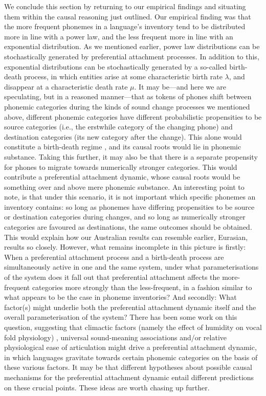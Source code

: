 We conclude this section by returning to our empirical findings and situating them within the causal reasoning just outlined. Our empirical finding was that the more frequent phonemes in a language's inventory tend to be distributed more in line with a power law, and the less frequent more in line with an exponential distribution. As we mentioned earlier, power law distributions can be stochastically generated by preferential attachment processes. In addition to this, exponential distributions can be stochastically generated by a so-called birth-death process, in which entities arise at some characteristic birth rate \(\lambda\), and disappear at a characteristic death rate \(\mu\). It may be---and here we are speculating, but in a reasoned manner---that as tokens of phones shift between phonemic categories during the kinds of sound change processes we mentioned above, different phonemic categories have different probabilistic propensities to be source categories (i.e., the erstwhile category of the changing phone) and destination categories (its new category after the change). This alone would constitute a birth-death regime \autocite{cysouw_probability_2009}, and its causal roots would lie in phonemic substance. Taking this further, it may also be that there is a separate propensity for phones to migrate towards numerically stronger categories. This would contribute a preferential attachment dynamic, whose causal roots would be something over and above mere phonemic substance. An interesting point to note, is that under this scenario, it is not important which specific phonemes an inventory contains: so long as phonemes have differing propensities to be source or destination categories during changes, and so long as numerically stronger categories are favoured as destinations, the same outcomes should be obtained. This would explain how our Australian results can resemble earlier, Eurasian, results so closely. However, what remains incomplete in this picture is firstly: When a preferential attachment process and a birth-death process are simultaneously active in one and the same system, under what parameterisations of the system does it fall out that preferential attachment affects the more-frequent categories more strongly than the less-frequent, in a fashion similar to what appears to be the case in phoneme inventories? And secondly: What factor(s) might underlie both the preferential attachment dynamic itself and the overall parameterisation of the system? There has been some work on this question, suggesting that climactic factors (namely the effect of humidity on vocal fold physiology) \autocite{everett_climate_2015}, universal sound-meaning associations \autocite{blasi_soundmeaning_2016} and/or relative physiological ease of articulation \autocites{everett_similar_2018}{everett_global_2018} might drive a preferential attachment dynamic, in which languages gravitate towards certain phonemic categories on the basis of these various factors. It may be that different hypotheses about possible causal mechanisms for the preferential attachment dynamic entail different predictions on these crucial points. These ideas are worth chasing up further.


